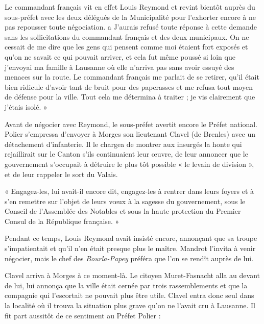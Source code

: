 \documentclass[french,twoside]{book} %
\newenvironment{quoteblock}%
  {\begin{quoting}}
  {\end{quoting}}
\newenvironment{quotebar}{%
    \def\FrameCommand{{\color{rubric!10!}\vrule width 0.5em} \hspace{0.9em}}%
    \def\OuterFrameSep{\itemsep} %
    \MakeFramed {\advance\hsize-\width \FrameRestore}
  }%
  {%
    \endMakeFramed
  }
\renewenvironment{quoteblock}%
  {%
    \savenotes
    \setstretch{0.9}
    \begin{quotebar}
  }
  {%
    \end{quotebar}
    \spewnotes
  }
\begin{document}
\noindent Le commandant français vit en effet Louis Reymond et revint bientôt auprès du sous-préfet avec les deux délégués de la Municipalité pour l’exhorter encore à ne pas repousser toute négociation. a J’aurais refusé toute réponse à cette demande sans les sollicitations du commandant français et des deux municipaux. On ne cessait de me dire que les gens qui pensent comme moi étaient fort exposés et qu’on ne savait ce qui pouvait arriver, et cela fut même poussé si loin que j’envoyai ma famille à Lausanne où elle n’arriva pas sans avoir essuyé des menaces sur la route. Le commandant français me parlait de se retirer, qu’il était bien ridicule d’avoir tant de bruit pour des paperasses et me refusa tout moyen de défense pour la ville. Tout cela me détermina à traiter ; je vis clairement que j’étais isolé. »\par
Avant de négocier avec Reymond, le sous-préfet avertit encore le Préfet national. Polier s’empressa d’envoyer à Morges son lieutenant Clavel (de Brenles) avec un détachement d’infanterie. Il le chargea de montrer aux insurgés la honte qui rejaillirait sur le Canton s’ils continuaient leur œuvre, de leur annoncer que le gouvernement s’occupait à détruire le plus tôt possible « le levain de division », et de leur rappeler le sort du Valais.\par

\begin{quoteblock}
 \noindent « Engagez-les, lui avait-il encore dit, engagez-les à rentrer dans leurs foyers et à s’en remettre sur l’objet de leurs vœux à la sagesse du gouvernement, sous le Conseil de l’Assemblée des Notables et sous la haute protection du Premier Consul de la République française. »
 \end{quoteblock}

\noindent Pendant ce temps, Louis Reymond avait insisté encore, annonçant que sa troupe s’impatientait et qu’il n’en était presque plus le maître. Mandrot l’invita à venir négocier, mais le chef des \emph{Bourla-Papey} préféra que l’on se rendît auprès de lui.\par
Clavel arriva à Morges à ce moment-là. Le citoyen Muret-Fasnacht alla au devant de lui, lui annonça que la ville était cernée par trois rassemblements et que la compagnie qui l’escortait ne pouvait plus être utile. Clavel entra donc seul dans la localité où il trouva la situation plus grave qu’on ne l’avait cru à Lausanne. Il fit part aussitôt de ce sentiment au Préfet Polier :\par
\end{document}
